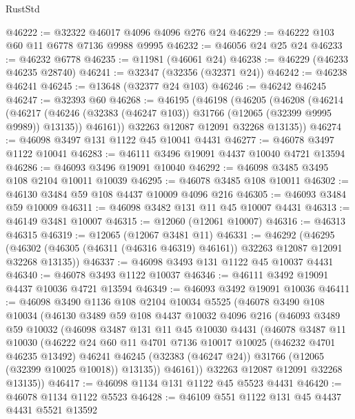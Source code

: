 \begin{lexlean}{RustStd}
\begin{coremodule}
@46222 := @32322 @46017 @4096 @4096 @276 @24
@46229 := @46222 @103 @60 @11 @6778 @7136 @9988 @9995
@46232 := @46056 @24 @25 @24
@46233 := @46232 @6778
@46235 := @11981 (@46061 @24)
@46238 := @46229 (@46233 @46235 @28740)
@46241 := @32347 (@32356 (@32371 @24))
@46242 := @46238 @46241
@46245 := @13648 (@32377 @24 @103)
@46246 := @46242 @46245
@46247 := @32393 @60
@46268 := @46195
    (@46198
      (@46205
        (@46208
          (@46214
            (@46217 (@46246 (@32383 (@46247 @103)) @31766 (@12065 (@32399 @9995 @9989)) @13135))
            @46161))
        @32263
        @12087
        @12091
        @32268
        @13135))
@46274 := @46098 @3497 @131 @1122 @45 @10041 @4431
@46277 := @46078 @3497 @1122 @10041
@46283 := @46111 @3496 @19091 @4437 @10040 @4721 @13594
@46286 := @46093 @3496 @19091 @10040
@46292 := @46098 @3485 @3495 @108 @2104 @10011 @10039
@46295 := @46078 @3485 @108 @10011
@46302 := @46130 @3484 @59 @108 @4437 @10009 @4096 @216
@46305 := @46093 @3484 @59 @10009
@46311 := @46098 @3482 @131 @11 @45 @10007 @4431
@46313 := @46149 @3481 @10007
@46315 := @12060 (@12061 @10007)
@46316 := @46313 @46315
@46319 := @12065 (@12067 @3481 @11)
@46331 := @46292
    (@46295 (@46302 (@46305 (@46311 (@46316 @46319) @46161)) @32263 @12087 @12091 @32268 @13135))
@46337 := @46098 @3493 @131 @1122 @45 @10037 @4431
@46340 := @46078 @3493 @1122 @10037
@46346 := @46111 @3492 @19091 @4437 @10036 @4721 @13594
@46349 := @46093 @3492 @19091 @10036
@46411 := @46098
    @3490
    @1136
    @108
    @2104
    @10034
    @5525
    (@46078
      @3490
      @108
      @10034
      (@46130
        @3489
        @59
        @108
        @4437
        @10032
        @4096
        @216
        (@46093
          @3489
          @59
          @10032
          (@46098
            @3487
            @131
            @11
            @45
            @10030
            @4431
            (@46078
              @3487
              @11
              @10030
              (@46222
                @24
                @60
                @11
                @4701
                @7136
                @10017
                @10025
                (@46232 @4701 @46235 @13492)
                @46241
                @46245
                (@32383 (@46247 @24))
                @31766
                (@12065 (@32399 @10025 @10018))
                @13135))
            @46161))
        @32263
        @12087
        @12091
        @32268
        @13135))
@46417 := @46098 @1134 @131 @1122 @45 @5523 @4431
@46420 := @46078 @1134 @1122 @5523
@46428 := @46109 @551 @1122 @131 @45 @4437 @4431 @5521 @13592

\end{coremodule}
\end{lexlean}
